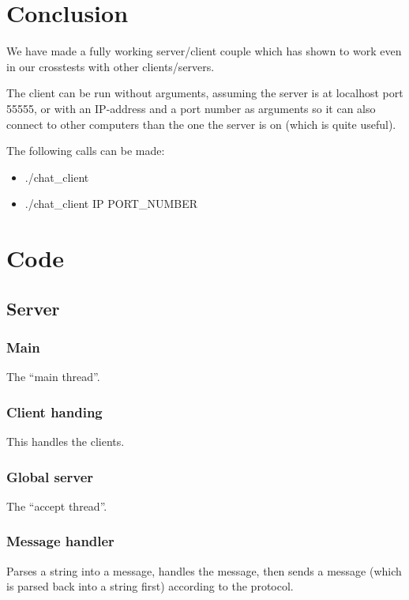 \documentclass[a4paper]{article}
\begin{document}
\section{Conclusion}
We have made a fully working server/client couple which has shown to work even
in our crosstests with other clients/servers.

The client can be run without arguments, assuming the server is at localhost
port 55555, or with an IP-address and a port number as arguments so it can also
connect to other computers than the one the server is on (which is quite
useful).

The following calls can be made:
\begin{itemize}
\item ./chat\_client
\item ./chat\_client IP PORT\_NUMBER
\end{itemize}

\appendix
\section{Code}
\subsection{Server}
\subsubsection{Main}
The ``main thread''.




\subsubsection{Client handing}
This handles the clients.


\subsubsection{Global server}
The ``accept thread''.


\subsubsection{Message handler}
Parses a string into a message, handles the message, then sends a message
(which is parsed back into a string first) according to the protocol.

\end{document}
